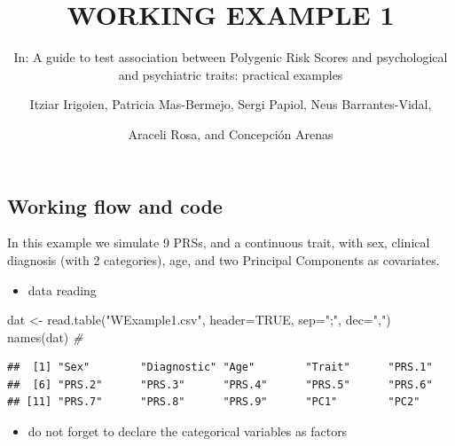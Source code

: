 \documentclass[
]{article}
\title{WORKING EXAMPLE 1}
\subtitle{In: A guide to test association between Polygenic Risk Scores
and psychological and psychiatric traits: practical examples}
\author{Itziar Irigoien, Patricia Mas-Bermejo, Sergi Papiol, Neus
Barrantes-Vidal, \and Araceli Rosa, and Concepción Arenas}
\date{}
\newenvironment{Shaded}{\begin{snugshade}}{\end{snugshade}}
\newcommand{\AttributeTok}[1]{\textcolor[rgb]{0.77,0.63,0.00}{#1}}
\newcommand{\CommentTok}[1]{\textcolor[rgb]{0.56,0.35,0.01}{\textit{#1}}}
\newcommand{\ConstantTok}[1]{\textcolor[rgb]{0.00,0.00,0.00}{#1}}
\newcommand{\FunctionTok}[1]{\textcolor[rgb]{0.00,0.00,0.00}{#1}}
\newcommand{\NormalTok}[1]{#1}
\newcommand{\OtherTok}[1]{\textcolor[rgb]{0.56,0.35,0.01}{#1}}
\newcommand{\SpecialCharTok}[1]{\textcolor[rgb]{0.00,0.00,0.00}{#1}}
\newcommand{\StringTok}[1]{\textcolor[rgb]{0.31,0.60,0.02}{#1}}
\providecommand{\tightlist}{%
  \setlength{\itemsep}{0pt}\setlength{\parskip}{0pt}}
\begin{document}
\maketitle

\hypertarget{working-flow-and-code}{%
\subsection{Working flow and code}\label{working-flow-and-code}}

In this example we simulate 9 PRSs, and a continuous trait, with sex,
clinical diagnosis (with 2 categories), age, and two Principal
Components as covariates.

\begin{itemize}
\tightlist
\item
  data reading
\end{itemize}

\begin{Shaded}
\begin{Highlighting}[]
\NormalTok{dat }\OtherTok{\textless{}{-}} \FunctionTok{read.table}\NormalTok{(}\StringTok{"WExample1.csv"}\NormalTok{, }\AttributeTok{header=}\ConstantTok{TRUE}\NormalTok{, }\AttributeTok{sep=}\StringTok{";"}\NormalTok{, }\AttributeTok{dec=}\StringTok{","}\NormalTok{)}
\FunctionTok{names}\NormalTok{(dat) }\CommentTok{\#}
\end{Highlighting}
\end{Shaded}

\begin{verbatim}
##  [1] "Sex"        "Diagnostic" "Age"        "Trait"      "PRS.1"     
##  [6] "PRS.2"      "PRS.3"      "PRS.4"      "PRS.5"      "PRS.6"     
## [11] "PRS.7"      "PRS.8"      "PRS.9"      "PC1"        "PC2"
\end{verbatim}

\bigskip

\begin{itemize}
\tightlist
\item
  do not forget to declare the categorical variables as factors
\end{itemize}

\begin{Shaded}
\end{Shaded}
\end{document}
